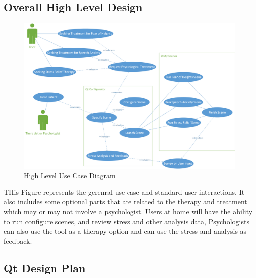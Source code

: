 \documentclass[a4paper,10pt]{article}
\begin{document}
	\subsection{Overall High Level Design}
		\begin{figure}[H]
			\includegraphics[width=\linewidth,height=\paperheight,keepaspectratio]{highUseCase.png}
			\caption{High Level Use Case Diagram}
			\label{fig:highlevelusecase}
		\end{figure}
		THis Figure represents the gerenral use case and standard user interactions. It also includes some optional parts that are related to the therapy and treatment which 
		may or may not involve a psychologist. Users at home will have the ability to run configure scenes, and review stress and other analysis data, Psychologists can also use
		the tool as a therapy option and can use the stress and analysis as feedback.
	\pagebreak
	\subsection{Qt Design Plan}
\end{document}
